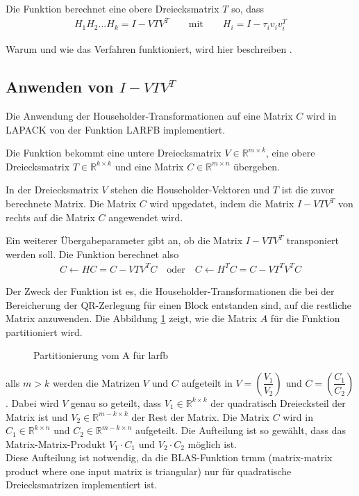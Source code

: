 Die Funktion berechnet eine obere Dreiecksmatrix $T$ so, dass
\begin{align*}
H_1H_2...H_k = I - VTV^T \qquad \text{mit}\qquad H_i = I - \tau_i v_iv_i^T
\end{align*}

Warum und wie das Verfahren funktioniert, wird hier beschreiben \cite{Joffrain:2006:AHT:1141885.1141886}.

\subsection{Anwenden von $I - VTV^T$}
Die Anwendung der Householder-Transformationen auf eine Matrix $C$ wird in LAPACK von der  Funktion \glqq LARFB\grqq{} implementiert.

Die Funktion bekommt eine untere Dreiecksmatrix $V \in \mathbb{R}^{m \times k}$, eine obere Dreiecksmatrix $T \in \mathbb{R}^{k \times k}$ und eine Matrix $C \in \mathbb{R}^{m \times n }$ übergeben.

In der Dreiecksmatrix $V$ stehen die Householder-Vektoren und $T$ ist die zuvor berechnete Matrix.
Die Matrix $C$ wird upgedatet, indem die Matrix $I - V T V^T $ von rechts auf die Matrix $ C $ angewendet wird. 

Ein weiterer Übergabeparameter gibt an, ob die Matrix  $I - V T V^T $ transponiert werden soll.
Die Funktion berechnet also
\begin{align}
	C \leftarrow H C = C - V T V^T C \quad \text{oder} \quad 	C \leftarrow H^T C = C - V T^T V^T C	\label{eq:larfb}
\end{align}

Der Zweck der Funktion ist es, die Householder-Transformationen die bei der Bereicherung der QR-Zerlegung für einen Block entstanden sind, auf die restliche Matrix anzuwenden.
Die Abbildung \ref{fig:patrA} zeigt, wie die Matrix $A$ für die Funktion partitioniert wird.
\begin{figure} [H]
	\centering
	
	\caption{Partitionierung vom A für larfb}
	\label{fig:patrA}
\end{figure}
alls $m > k $ werden die Matrizen $V$ und $C$ aufgeteilt in $V=\left(\dfrac{V_1}{V_2}\right)$ und $C=\left(\dfrac{C_1}{C_2}\right)$.
Dabei wird $V$ genau so geteilt, dass $V_1 \in \mathbb{R}^{k\times k}$ der quadratisch Dreiecksteil der Matrix ist und $V_2 \in \mathbb{R}^{m-k\times k}$ der Rest der Matrix. Die Matrix $C$ wird in $C_1 \in \mathbb{R}^{k \times n}$ und $C_2 \in \mathbb{R}^{m-k \times n}$  aufgeteilt. Die Aufteilung ist so gewählt, dass das Matrix-Matrix-Produkt $V_1 \cdot C_1$ und $V_2 \cdot C_2$ möglich ist.\\
Diese Aufteilung ist notwendig, da die BLAS-Funktion trmm (matrix-matrix product where one input matrix is triangular) nur für quadratische Dreiecksmatrizen implementiert ist.

